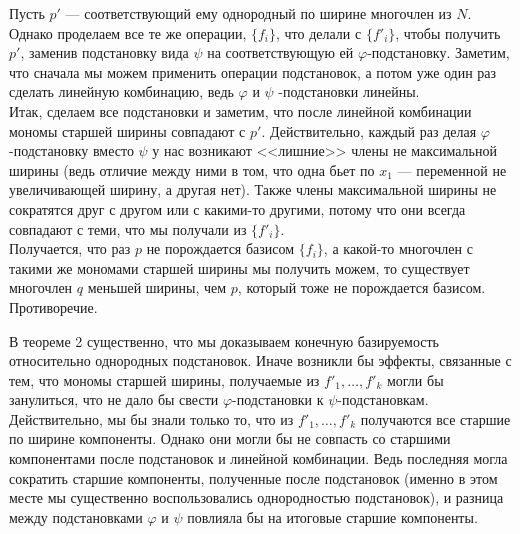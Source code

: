 Пусть $p'$ --- соответствующий ему однородный по ширине многочлен из $N$.\\
Однако проделаем все те же операции, $\{f_i\}$, что делали с $\{f'_i\}$, чтобы получить $p'$, заменив подстановку вида $\psi$ на соответствующую ей $\varphi$-подстановку.
Заметим, что сначала мы можем применить операции подстановок, а потом уже один раз сделать линейную комбинацию, ведь $\varphi$ и $\psi$ -подстановки линейны.\\
Итак, сделаем все подстановки и заметим, что после линейной комбинации мономы старшей ширины совпадают с $p'$.
Действительно, каждый раз делая  $\varphi$-подстановку вместо $\psi$ у нас возникают <<лишние>> члены не максимальной ширины (ведь отличие между ними в том, что одна бьет по $x_1$ --- переменной не увеличивающей ширину, а другая нет).
Также члены максимальной ширины не сократятся друг с другом или с какими-то другими, потому что они всегда совпадают с теми, что мы получали из $\{f'_i\}$.\\
Получается, что раз $p$ не порождается базисом $\{f_i\}$, а какой-то многочлен с такими же мономами старшей ширины мы получить можем, то существует многочлен $q$ меньшей ширины, чем $p$, который тоже не порождается базисом.
Противоречие.
\vskip 0.1in\noindent
\begin{remark}
    В теореме 2 существенно, что мы доказываем конечную базируемость относительно однородных подстановок.
    Иначе возникли бы эффекты, связанные с тем, что мономы старшей ширины, получаемые из $f'_1,\ldots,f'_k$ могли бы занулиться, что не дало бы свести $\varphi$-подстановки к $\psi$-подстановкам. \\Действительно, мы бы знали только то, что из $f'_1,\ldots,f'_k$ получаются все старшие по ширине компоненты.
    Однако они могли бы не совпасть со старшими компонентами после подстановок и линейной комбинации.
    Ведь последняя могла сократить старшие компоненты, полученные после подстановок (именно в этом месте мы существенно воспользовались однородностью подстановок), и разница между подстановками $\varphi$ и $\psi$ повлияла бы на итоговые старшие компоненты.
\end{remark}